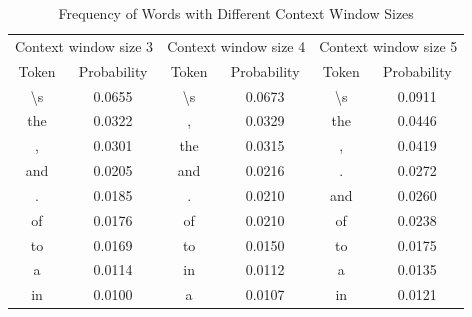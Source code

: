 \documentclass[12pt]{article} \usepackage{COSC420style} \usepackage{soul}
\begin{document}
\begin{table}[htbp]
	\centering
	\caption{Frequency of Words with Different Context Window Sizes}
	\label{tab:word_frequencies}
	\begin{tabular}{cccccc}
		\toprule
		\multicolumn{2}{c}{Context window size 3} & \multicolumn{2}{c}{Context window size 4} & \multicolumn{2}{c}{Context window size 5}                                                \\
		\cmidrule(r){1-2} \cmidrule(lr){3-4} \cmidrule(l){5-6}
		Token                                     & Probability                               & Token                                     & Probability & Token            & Probability \\
		\midrule
		\textbackslash s                          & 0.0655                                    & \textbackslash s                          & 0.0673      & \textbackslash s & 0.0911      \\
		the                                       & 0.0322                                    & ,                                         & 0.0329      & the              & 0.0446      \\
		,                                         & 0.0301                                    & the                                       & 0.0315      & ,                & 0.0419      \\
		and                                       & 0.0205                                    & and                                       & 0.0216      & .                & 0.0272      \\
		.                                         & 0.0185                                    & .                                         & 0.0210      & and              & 0.0260      \\
		of                                        & 0.0176                                    & of                                        & 0.0210      & of               & 0.0238      \\
		to                                        & 0.0169                                    & to                                        & 0.0150      & to               & 0.0175      \\
		a                                         & 0.0114                                    & in                                        & 0.0112      & a                & 0.0135      \\
		in                                        & 0.0100                                    & a                                         & 0.0107      & in               & 0.0121      \\

\end{tabular}
\end{table}
\end{document}
